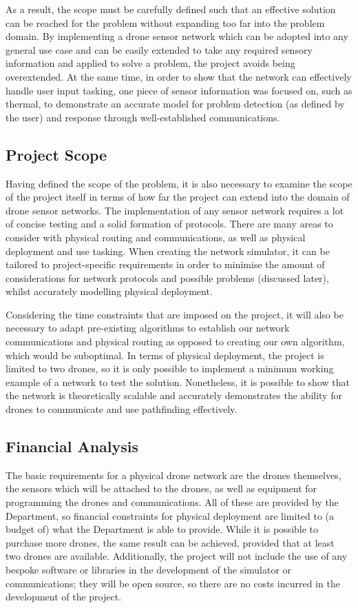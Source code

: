 As a result, the scope must be carefully defined such that an effective solution can be reached for the problem without expanding too far into the problem domain. By implementing a drone sensor network which can be adopted into any general use case and can be easily extended to take any required sensory information and applied to solve a problem, the project avoids being overextended. At the same time, in order to show that the network can effectively handle user input tasking, one piece of sensor information was focused on, such as thermal, to demonstrate an accurate model for problem detection (as defined by the user) and response through well-established communications. 

\subsection{Project Scope}
Having defined the scope of the problem, it is also necessary to examine the scope of the project itself in terms of how far the project can extend into the domain of drone sensor networks. The implementation of any sensor network requires a lot of concise testing and a solid formation of protocols. There are many areas to consider with physical routing and communications, as well as physical deployment and use tasking. When creating the network simulator, it can be tailored to project-specific requirements in order to minimise the amount of considerations for network protocols and possible problems (discussed later), whilst accurately modelling physical deployment. 

Considering the time constraints that are imposed on the project, it will also be necessary to adapt pre-existing algorithms to establish our network communications and physical routing as opposed to creating our own algorithm, which would be suboptimal. In terms of physical deployment, the project is limited to two drones, so it is only possible to implement a minimum working example of a network to test the solution. Nonetheless, it is possible to show that the network is theoretically scalable and accurately demonstrates the ability for drones to communicate and use pathfinding effectively.

\subsection{Financial Analysis}
The basic requirements for a physical drone network are the drones themselves, the sensors which will be attached to the drones, as well as equipment for programming the drones and communications. All of these are provided by the Department, so financial constraints for physical deployment are limited to (a budget of) what the Department is able to provide. While it is possible to purchase more drones, the same result can be achieved, provided that at least two drones are available. Additionally, the project will not include the use of any bespoke software or libraries in the development of the simulator or communications; they will be open source, so there are no costs incurred in the development of the project.

